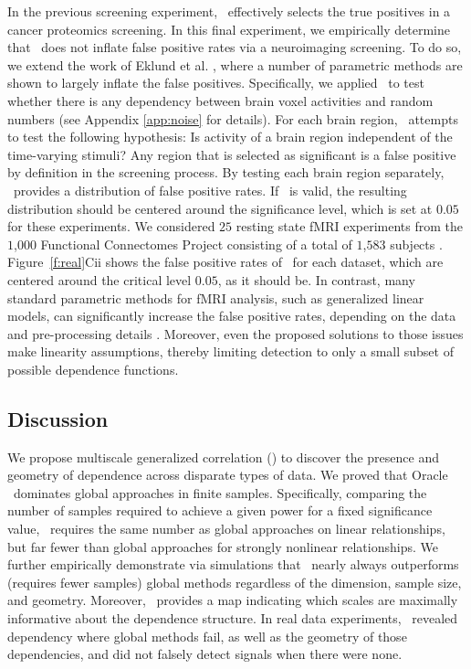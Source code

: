 \documentclass[11pt]{extarticle}
\begin{document}
In the previous screening experiment, \Mgc~effectively selects the true positives in a cancer proteomics screening. In this final experiment, we empirically determine that \Mgc~does not inflate false positive rates via a neuroimaging screening.
To do so, we extend the work of Eklund et al. \cite{EklundKnutsson2012,Eklund2015},
where a number of parametric methods are shown to largely inflate the false positives. Specifically, we applied \Mgc~to test whether there is any dependency between brain voxel activities and random numbers (see Appendix \ref{app:noise} for details).
For each brain region, \Mgc~attempts to test the following hypothesis: Is activity of a  brain region independent of the time-varying stimuli?
Any region that is selected as significant is a false positive by definition in the screening process.  By testing each brain region separately, \Mgc~provides a distribution of false positive rates.  If \Mgc~is valid, the resulting distribution should be centered around the significance level, which is set at $0.05$ for these experiments.
%
We considered $25$ resting state fMRI experiments from the $1$,$000$ Functional Connectomes Project  consisting of a total of $1$,$583$ subjects \cite{biswal2010toward}.
Figure~\ref{f:real}{\color{magenta}Cii} shows the false positive rates of  \Mgc~for each dataset, which are centered around the critical level $0.05$, as it should be.
In contrast, many standard parametric methods for fMRI analysis, such as generalized linear models, can significantly increase the false positive rates, depending on the data and pre-processing details \cite{EklundKnutsson2012,Eklund2015}. Moreover, even the proposed solutions to those issues make linearity assumptions, thereby limiting detection to only a small subset of possible dependence functions.

\subsection*{Discussion}
\label{conclu}

We propose multiscale generalized correlation (\Mgc) to discover the presence and geometry of dependence across disparate types of data.
We proved that Oracle \Mgc~dominates global approaches in finite samples.  Specifically, comparing the number of samples required to achieve a given power for a fixed significance value, \Mgc~requires the same number as  global approaches on linear relationships, but far fewer than global approaches for strongly nonlinear relationships. We further empirically demonstrate via simulations that \Mgc~nearly always outperforms (requires fewer samples) global methods regardless of the dimension, sample size, and geometry.  Moreover, \Mgc~provides a map indicating which scales are maximally informative about the dependence structure.
In real data experiments, \Mgc~revealed dependency where global methods fail, as well as the geometry of those dependencies, and did not falsely detect signals when there were none.
\end{document}
